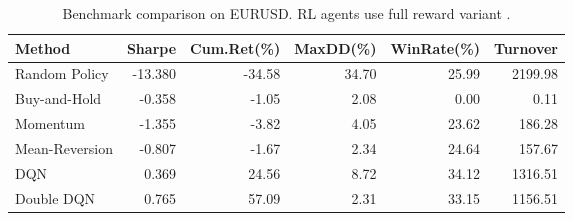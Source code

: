 \begin{table}[!tbp]
\centering
\caption{Benchmark comparison on EURUSD. RL agents use full reward variant .}
\label{tab:benchmarks}
\begin{adjustbox}{width=\linewidth}
\begin{tabular}{@{}lrrrrr@{}}
\toprule
\textbf{Method} & \textbf{Sharpe} & \textbf{Cum.Ret(\%)} & \textbf{MaxDD(\%)} & \textbf{WinRate(\%)} & \textbf{Turnover} \\
\midrule
Random Policy & -13.380 & -34.58 & 34.70 & 25.99 & 2199.98 \\
Buy-and-Hold & -0.358 & -1.05 & 2.08 & 0.00 & 0.11 \\
Momentum & -1.355 & -3.82 & 4.05 & 23.62 & 186.28 \\
Mean-Reversion & -0.807 & -1.67 & 2.34 & 24.64 & 157.67 \\
DQN & 0.369 & 24.56 & 8.72 & 34.12 & 1316.51 \\
Double DQN & 0.765 & 57.09 & 2.31 & 33.15 & 1156.51 \\
\bottomrule
\end{tabular}
\end{adjustbox}
\end{table}


